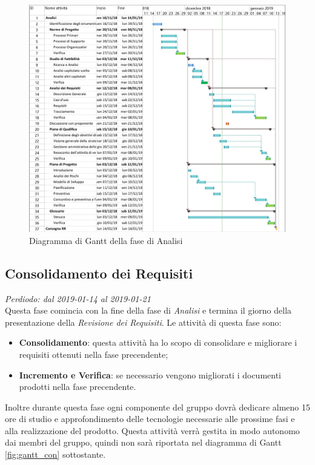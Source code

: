 \begin{figure}[H]
	\includegraphics[width=0.99\linewidth]{res/images/gantt_analisi.jpg}
	\caption{Diagramma di Gantt della fase di Analisi}
\end{figure}



\subsection{Consolidamento dei Requisiti}
\textit{Perdiodo: dal 2019-01-14 al 2019-01-21} \\
Questa fase comincia con la fine della fase di \textit{Analisi} e termina il giorno della presentazione della \textit{Revisione dei Requisiti}. Le attività di questa fase sono:
\begin{itemize}
	\item \textbf{Consolidamento}: questa attività ha lo scopo di consolidare e migliorare i requisiti ottenuti nella fase precendente;
	\item \textbf{Incremento e Verifica}: se necessario vengono migliorati i documenti prodotti nella fase precendente.
\end{itemize}
Inoltre durante questa fase ogni componente del gruppo dovrà dedicare almeno 15 
ore di studio e approfondimento delle tecnologie necessarie alle prossime fasi 
e alla realizzazione del prodotto. Questa attività verrà gestita in modo 
autonomo dai membri del gruppo, quindi non sarà riportata nel diagramma di 
Gantt \ref{fig:gantt_con} sottostante.

